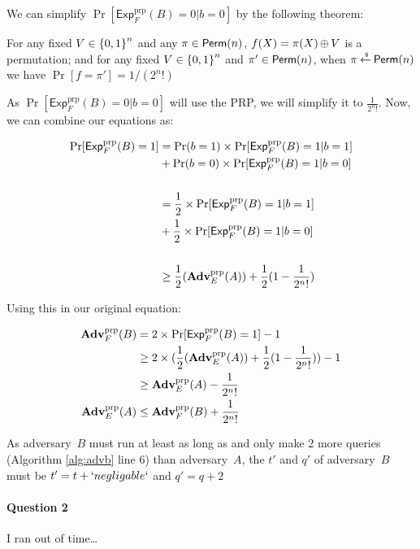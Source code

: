 \documentclass[11pt]{article}
\newcommand{\Prob}[1]{\Pr\left[#1\right]}
\newcommand{\ExpPRP}[2]{\mathsf{Exp}^{\mathrm{prp}}_{#1}{(#2)}}
\newcommand{\AdvPRP}[2]{\Adv^{\mathrm{prp}}_{#1} (#2)}
\begin{document}
We can simplify $\Pr[\ExpPRP{F}{B} = 0 \vert b = 0]$ by the following theorem:

\begin{theorem}
  For any fixed $V \in {\{0,1\}}^n$ and any $\pi \in \mathsf{Perm}({n})$, $f(X)=\pi(X) {\,\oplus\,} V$ is a permutation; and for any 
  fixed $V \in {\{0,1\}}^n$ and $\pi'\in \mathsf{Perm}({n})$, when $\pi {\:\stackrel{{\scriptscriptstyle \hspace{0.2em}\$}} {\leftarrow}\:} \mathsf{Perm}({n})$ we have $\Prob{f=\pi'}=1/(2^n!)$
\end{theorem}

As $\Pr[\ExpPRP{F}{B} = 0 \vert b = 0]$ will use the PRP, we will simplify it to $\frac{1}{2^{n}!}$. Now, we can combine our equations as:

\begin{equation}
  \begin{aligned}
  \Pr[\ExpPRP{F}{B} = 1] 
                        & = \Pr(b = 1) \times \Pr[\ExpPRP{F}{B} = 1 \vert b = 1]  \\
                        & + \Pr(b = 0) \times \Pr[\ExpPRP{F}{B} = 1 \vert b = 0] \\
                        \\
                        & = \frac{1}{2} \times \Pr[\ExpPRP{F}{B} = 1 \vert b = 1]  \\
                        & + \frac{1}{2} \times \Pr[\ExpPRP{F}{B} = 1 \vert b = 0] \\
                        \\
                        & \geq \frac{1}{2}(\AdvPRP{E}{A}) + \frac{1}{2}(1-\frac{1}{2^{n}!})
  \end{aligned}
\end{equation}

Using this in our original equation:

\begin{equation}
  \begin{aligned}
    \AdvPRP{F}{B} & = 2 \times \Pr[\ExpPRP{F}{B} = 1] - 1\\
                  & \geq 2 \times (\frac{1}{2}(\AdvPRP{E}{A}) + \frac{1}{2}(1-\frac{1}{2^{n}!})
) - 1 \\ 
                  & \geq \AdvPRP{E}{A} - \frac{1}{2^{n}!} \\
     \AdvPRP{E}{A} & \leq \AdvPRP{F}{B} + \frac{1}{2^{n}!}
  \end{aligned}
\end{equation}

As adversary~$B$ must run at least as long as and only make 2 more queries (Algorithm \ref{alg:advb} line 6) 
than adversary~$A$, the $t'$ and $q'$ of adversary~$B$ must be $t'=t + `negligable`$ and $q'=q+2$

\paragraph{Question 2} I ran out of time\ldots{}
\end{document}
